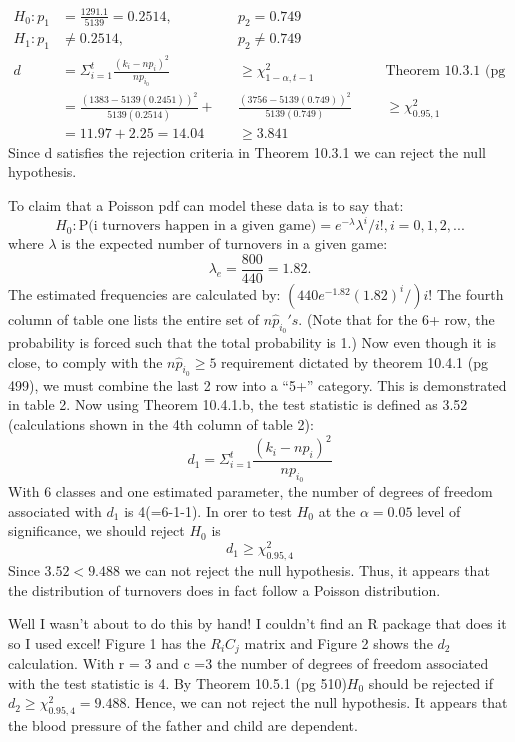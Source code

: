 \documentclass[12pt]{article}
\newenvironment{problem}[2][Problem]{\begin{trivlist}
\item[\hskip \labelsep {\bfseries #1}\hskip \labelsep {\bfseries #2.}]}{\end{trivlist}}
\begin{document}
\begin{problem}{10.3.6} 
\begin{align*}
H_0: p_1 &= \frac{1291.1}{5139}=0.2514, &&p_2 =0.749 \\ 
H_1: p_1 &\neq 0.2514 , &&p_2 \neq 0.749 \\
d&=\Sigma_{i=1}^{t}\frac{(k_i-np_i)^2}{np_{i_0}} &&\geq \chi^2_{1-\alpha , t-1} &&&\text{Theorem 10.3.1 (pg 489)} \\ 
&= \frac{(1383-5139(0.2451))^2}{5139(0.2514)} +&& \frac{(3756-5139(0.749))^2}{5139(0.749)} &&&\geq \chi^2_{0.95, 1} \ \ \ \ \ \ \ \ \ \ \ \ \ \ \\
&= 11.97 + 2.25 = 14.04 && \geq 3.841
\end{align*}
Since d satisfies the rejection criteria in Theorem 10.3.1 we can reject the null hypothesis. 
\end{problem}

\begin{problem}{10.4.10} To claim that a Poisson pdf can model these data is to say that: 
$$H_0:\text{P(i turnovers happen in a given game)}=e^{-\lambda } \lambda^i/i!, i = 0,1,2,...$$
where $\lambda $ is the expected number of turnovers in a given game: $$\lambda_e = \frac{800}{440} = 1.82.$$
The estimated frequencies are calculated by: $(440e^{-1.82}(1.82)^i/)i!$ The fourth column of table one lists the entire set of $n\hat{p}_{i_0}'s$. (Note that for the 6+ row, the probability is forced such that the total probability is 1.) Now even though it is close, to comply with the $n\hat{p}_{i_0} \geq 5$ requirement dictated by theorem 10.4.1 (pg 499), we must combine the last 2 row into a ``5+'' category. This is demonstrated in table 2. Now using Theorem 10.4.1.b, the test statistic is defined as 3.52 (calculations shown in the 4th column of table 2): 
$$ d_1=\Sigma_{i=1}^{t}\frac{(k_i-np_i)^2}{np_{i_0}}$$
With 6 classes and one estimated parameter, the number of degrees of freedom associated with $d_1$ is 4(=6-1-1). In orer to test $H_0$ at the $\alpha = 0.05$ level of significance, we should reject $H_0$ is $$ d_1 \geq \chi^2_{0.95,4}$$ Since $3.52 < 9.488$ we can not reject the null hypothesis. Thus, it appears that the distribution of turnovers does in fact follow a Poisson distribution.  
\end{problem}

\begin{problem}{10.5.6} 
Well I wasn't about to do this by hand! I couldn't find an R package that does it so I used excel! Figure 1 has the $R_iC_j$ matrix and Figure 2 shows the $d_2$ calculation. With r = 3 and c =3 the number of degrees of freedom associated with the test statistic is 4. By Theorem 10.5.1 (pg 510)$H_0$ should be rejected if $d_2 \geq \chi^2_{0.95,4} = 9.488$. Hence, we can not reject the null hypothesis. It appears that the blood pressure of the father and child are dependent. 

\end{problem}
\end{document}
